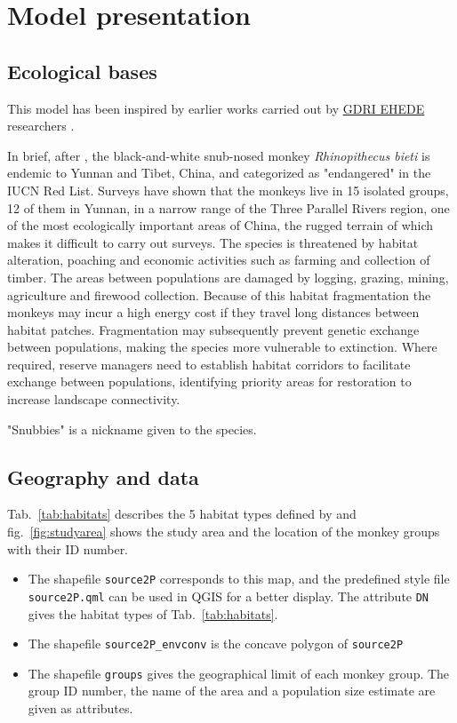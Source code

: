 \chapter{Model presentation}
\label{chap:Model Presentation}


\section{Ecological bases}

This model has been inspired by earlier works carried out by \href{https://gdri-ehede.univ-fcomte.fr}{GDRI EHEDE} researchers \citep{Li2015,Clauzel2015,Li2017}.

In brief, after \citet{Li2015}, the black-and-white snub-nosed monkey \textit{Rhinopithecus bieti} is endemic to Yunnan and Tibet, China, and categorized as "endangered" in the IUCN Red List. Surveys have shown that the monkeys live in 15 isolated groups, 12 of them in Yunnan, in a narrow range of the Three Parallel Rivers region, one of the most ecologically important areas of China, the rugged terrain of which makes it difficult to carry out surveys. The species is threatened by habitat alteration, poaching and economic activities such as farming and collection of timber. The areas between populations are damaged by logging, grazing, mining, agriculture and firewood collection. Because of this habitat fragmentation the monkeys may incur a high energy cost if they travel long distances between habitat patches. Fragmentation may subsequently prevent genetic exchange between populations, making the species more vulnerable to extinction. Where required, reserve managers need to establish habitat corridors to facilitate exchange between populations, identifying priority areas for restoration to increase landscape connectivity.

"Snubbies" is a nickname given to the species.

\section{Geography and data}

 Tab.~\ref{tab:habitats} describes the 5 habitat types defined by \citet{Li2017} and fig.~\ref{fig:studyarea} shows the study area and the location of the monkey groups with their ID number.
 
 \begin{itemize}
 \item The shapefile \texttt{source2P} corresponds to this map, and the predefined style file \texttt{source2P.qml} can be used in QGIS for a better display. The attribute \texttt{DN} gives the habitat types of Tab.~\ref{tab:habitats}.
 \item The shapefile \texttt{source2P\_envconv} is the concave polygon of \texttt{source2P}
 \item The shapefile \texttt{groups} gives the geographical limit of each monkey group. The group ID number, the name of the area and a population size estimate are given as attributes.
 \end{itemize}

